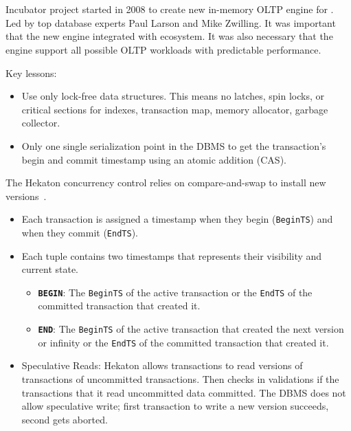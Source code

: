 \documentclass[11pt]{article}
\begin{document}
\maketitle
\thispagestyle{plain}

\section{}
Incubator project started in 2008 to create new in-memory OLTP engine for . Led by top database experts Paul Larson and Mike Zwilling. It was important that the new 
engine integrated with  ecosystem. It was also necessary that the engine support all 
possible OLTP workloads with predictable performance.

Key lessons:
\begin{itemize}
    \item
    Use only lock-free data structures. This means no latches, spin locks, or critical 
    sections for indexes, transaction map, memory allocator, garbage collector.
        
    \item
    Only one single serialization point in the DBMS to get the transaction's begin and commit 
    timestamp using an atomic addition (CAS).
\end{itemize}

The Hekaton concurrency control relies on compare-and-swap to install new 
versions~\cite{p298-larson}.
\begin{itemize}
    \item
    Each transaction is assigned a timestamp when they begin (\texttt{BeginTS}) and when they 
    commit (\texttt{EndTS}).
        
    \item
    Each tuple contains two timestamps that represents their visibility and current state.
    \begin{itemize}
        \item \textbf{\texttt{BEGIN}}:
        The \texttt{BeginTS} of the active transaction or the \texttt{EndTS} of the committed 
        transaction that created it.
            
        \item \textbf{\texttt{END}}:
        The \texttt{BeginTS} of the active transaction that created the next version or 
        infinity or the \texttt{EndTS} of the committed transaction that created it.

    \end{itemize}
    
    \item Speculative Reads:
    Hekaton allows transactions to read versions of transactions of uncommitted 
    transactions. Then checks in validations if the transactions that it read uncommitted data 
    committed.
    The DBMS does not allow speculative write; first transaction to write a new version succeeds, 
    second gets aborted.
\end{itemize}
\end{document}
